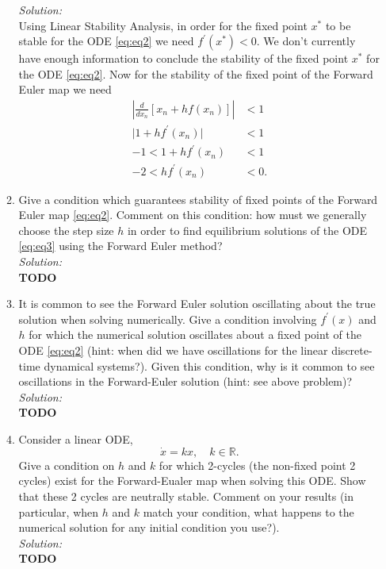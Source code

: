 \documentclass[10pt]{amsart}
\theoremstyle{nonumberplain}
\begin{document}
\begin{enumerate}[label={\bf {\arabic*}:}]
\begin{enumerate}
\textit{Solution:} \\
Using Linear Stability Analysis, in order for the fixed point $x^*$ to be stable for the ODE \eqref{eq:eq2} we need $f^\prime(x^*) < 0$.
We don't currently have enough information to conclude the stability of the fixed point $x^*$ for the ODE \eqref{eq:eq2}.
Now for the stability of the fixed point of the Forward Euler map we need
\begin{align*}
\left|\frac d{dx_n} \left[x_n + hf(x_n)\right]\right| &< 1 \\
\Big|1 + hf^\prime(x_n) \Big| &< 1 \\
-1 < 1 + hf^\prime(x_n) &< 1 \\
-2 < hf^\prime(x_n) &< 0.
\end{align*}

\item Give a condition which guarantees stability of fixed points of the Forward Euler map \eqref{eq:eq2}. 
Comment on this condition: how must we generally choose the step size $h$ in order to find equilibrium solutions of the ODE \eqref{eq:eq3} using the Forward Euler method? \\

\textit{Solution:} \\
\textbf{TODO} \\

\item It is common to see the Forward Euler solution oscillating about the true solution when solving numerically.
Give a condition involving $f^\prime(x)$ and $h$ for which the numerical solution oscillates about a fixed point of the ODE \eqref{eq:eq2} (hint: when did we have oscillations for the linear discrete-time dynamical systems?).
Given this condition, why is it common to see oscillations in the Forward-Euler solution (hint: see above problem)? \\

\textit{Solution:} \\
\textbf{TODO} \\

\item Consider a linear ODE, 
\begin{equation}
\dot x = kx, \quad k \in \mathbb R.
\label{eq:eq4}
\end{equation}
Give a condition on $h$ and $k$ for which 2-cycles (the non-fixed point 2 cycles) exist for the Forward-Eualer map when solving this ODE.
Show that these 2 cycles are neutrally stable.
Comment on your results (in particular, when $h$ and $k$ match your condition, what happens to the numerical solution for any initial condition you use?). \\

\textit{Solution:} \\
\textbf{TODO} \\

\end{enumerate}
\end{enumerate}
\end{document}
